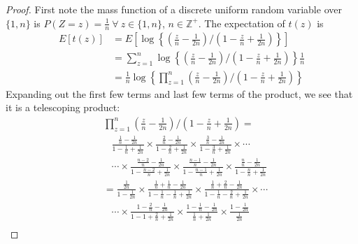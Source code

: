 \documentclass[12pt]{article}
\theoremstyle{plain}
\begin{document}
\begin{appendix}

\begin{proof}
First note the mass function of a discrete uniform random variable over $\{1, n\}$ is $P(Z = z) = \frac{1}{n}\ \forall\ z \in \{1, n\}$, $n \in \mathbb{Z}^+$. The expectation of $t(z)$ is
\begin{align*}
	E\left[ t(z) \right] &= E\left[ \log \left\{\left(\frac{z}{n} - \frac{1}{2n}\right) \bigg/ \left(1-\frac{z}{n} + \frac{1}{2n}\right) \right\} \right] \\
	&= \sum_{z = 1}^n \log \left\{\left(\frac{z}{n} - \frac{1}{2n}\right) \bigg/ \left(1-\frac{z}{n} + \frac{1}{2n}\right) \right\} \frac{1}{n}\\
	&= \frac{1}{n} \log \left\{ \prod_{z = 1}^n \left(\frac{z}{n} - \frac{1}{2n}\right) \bigg/ \left(1-\frac{z}{n} + \frac{1}{2n}\right) \right\} 
\end{align*}
Expanding out the first few terms and last few terms of the product, we see that it is a telescoping product:
\begin{align*}
	&\prod_{z = 1}^n \left(\frac{z}{n} - \frac{1}{2n}\right) \bigg/ \left(1-\frac{z}{n} + \frac{1}{2n}\right) = \\
	&\hspace{10pt} \frac{\frac{1}{n} - \frac{1}{2n}}{1-\frac{1}{n} + \frac{1}{2n}} \times \frac{\frac{2}{n} - \frac{1}{2n}}{1-\frac{2}{n} + \frac{1}{2n}} \times \frac{\frac{3}{n} - \frac{1}{2n}}{1-\frac{3}{n} + \frac{1}{2n}} \times \cdots\\
	&\hspace{10pt}\cdots \times \frac{\frac{n-2}{n} - \frac{1}{2n}}{1-\frac{n-2}{n} + \frac{1}{2n}} \times \frac{\frac{n-1}{n} - \frac{1}{2n}}{1-\frac{n-1}{n} + \frac{1}{2n}} \times \frac{\frac{n}{n} - \frac{1}{2n}}{1-\frac{n}{n} + \frac{1}{2n}}\\
	&= \frac{\frac{1}{2n}}{1-\frac{1}{2n}} \times \frac{\frac{1}{n} + \frac{1}{n} - \frac{1}{2n}}{1-\frac{1}{n} -\frac{1}{n} + \frac{1}{2n}} \times \frac{\frac{1}{n} + \frac{2}{n} - \frac{1}{2n}}{1-\frac{1}{n} - \frac{2}{n} + \frac{1}{2n}} \times \cdots\\
	&\hspace{10pt}\cdots \times \frac{1 - \frac{2}{n} - \frac{1}{2n}}{1- 1 + \frac{2}{n} + \frac{1}{2n}} \times \frac{1 -\frac{1}{n} - \frac{1}{2n}}{\frac{1}{n} + \frac{1}{2n}} \times \frac{1 - \frac{1}{2n}}{\frac{1}{2n}}\\

\end{align*}
\end{proof}
\end{appendix}
\end{document}

